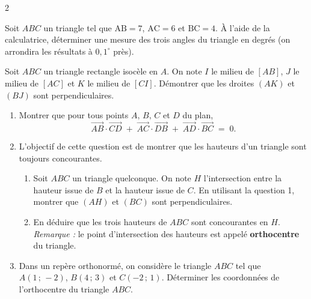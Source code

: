 \documentclass[a4paper,12pt]{article}
\begin{document}
\begin{multicols}{2}
  \begin{exercice}[title=Exercice 14 $\star\star$ { [Représenter, Calculer] }]{}{}
    Soit \(ABC\) un triangle tel que \(\mathrm{AB} = 7\), \(\mathrm{AC} = 6\) et \(\mathrm{BC} = 4\).
    À l'aide de la calculatrice, déterminer une mesure des trois angles du triangle en degrés (on arrondira les résultats à \(0{,}1^\circ\) près).
  \end{exercice}

  \begin{exercice}[title=Exercice 15 $\star\star\star$ { [Chercher, Représenter] }]{}{}
    Soit \(ABC\) un triangle rectangle isocèle en \(A\). On note \(I\) le milieu de \([AB]\), \(J\) le milieu de \([AC]\) et \(K\) le milieu de \([CI]\).
    Démontrer que les droites \((AK)\) et \((BJ)\) sont perpendiculaires.
  \end{exercice}

  \newcolumn

  \begin{exercice}[title=Exercice 16 $\star\star\star$ { [Chercher, Raisonner, Représenter] }]{}{}
    \begin{enumerate}
      \item Montrer que pour tous points \(A,\,B,\,C\) et \(D\) du plan,
        \[
          \overrightarrow{AB}\cdot\overrightarrow{CD}
          \;+\;
          \overrightarrow{AC}\cdot\overrightarrow{DB}
          \;+\;
          \overrightarrow{AD}\cdot\overrightarrow{BC}
          \;=\;
          0.
        \]

      \item L'objectif de cette question est de montrer que les hauteurs d'un triangle sont toujours concourantes.
        \begin{enumerate}
          \item[(a)] Soit \(ABC\) un triangle quelconque. On note \(H\) l'intersection entre la hauteur issue de \(B\) et la hauteur issue de \(C\).
            En utilisant la question 1, montrer que \((AH)\) et \((BC)\) sont perpendiculaires.
          \item[(b)] En déduire que les trois hauteurs de \(ABC\) sont concourantes en \(H\).
            \textit{Remarque :} le point d'intersection des hauteurs est appelé \textbf{orthocentre} du triangle.
        \end{enumerate}

      \item Dans un repère orthonormé, on considère le triangle \(ABC\) tel que \(A(1\,;\,-2)\), \(B(4\,;\,3)\) et \(C(-2\,;\,1)\).
        Déterminer les coordonnées de l'orthocentre du triangle \(ABC\).
    \end{enumerate}
  \end{exercice}


\end{multicols}
\end{document}
